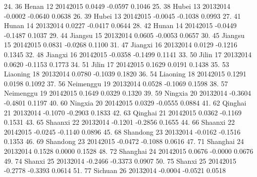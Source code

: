  24. {\VBAR}  36          Henan   12   2014{\tytilde}2015    0.0449   -0.0597   0.1046 {\VBAR}
 25. {\VBAR}  38          Hubei   13   2013{\tytilde}2014   -0.0002   -0.0640   0.0638 {\VBAR}
 26. {\VBAR}  39          Hubei   13   2014{\tytilde}2015   -0.0045   -0.1038   0.0993 {\VBAR}
 27. {\VBAR}  41          Hunan   14   2013{\tytilde}2014    0.0227   -0.0417   0.0644 {\VBAR}
 28. {\VBAR}  42          Hunan   14   2014{\tytilde}2015   -0.0449   -0.1487   0.1037 {\VBAR}
 29. {\VBAR}  44        Jiangsu   15   2013{\tytilde}2014    0.0605   -0.0053   0.0657 {\VBAR}
 30. {\VBAR}  45        Jiangsu   15   2014{\tytilde}2015    0.0831   -0.0268   0.1100 {\VBAR}
 31. {\VBAR}  47        Jiangxi   16   2013{\tytilde}2014    0.0129   -0.1216   0.1345 {\VBAR}
 32. {\VBAR}  48        Jiangxi   16   2014{\tytilde}2015   -0.0358   -0.1499   0.1141 {\VBAR}
 33. {\VBAR}  50          Jilin   17   2013{\tytilde}2014    0.0620   -0.1153   0.1773 {\VBAR}
 34. {\VBAR}  51          Jilin   17   2014{\tytilde}2015    0.1629    0.0191   0.1438 {\VBAR}
 35. {\VBAR}  53       Liaoning   18   2013{\tytilde}2014    0.0780   -0.1039   0.1820 {\VBAR}
 36. {\VBAR}  54       Liaoning   18   2014{\tytilde}2015    0.1291    0.0198   0.1092 {\VBAR}
 37. {\VBAR}  56      Neimenggu   19   2013{\tytilde}2014    0.0528   -0.1069   0.1598 {\VBAR}
 38. {\VBAR}  57      Neimenggu   19   2014{\tytilde}2015    0.1649    0.0329   0.1320 {\VBAR}
 39. {\VBAR}  59        Ningxia   20   2013{\tytilde}2014   -0.3604   -0.4801   0.1197 {\VBAR}
 40. {\VBAR}  60        Ningxia   20   2014{\tytilde}2015    0.0329   -0.0555   0.0884 {\VBAR}
 41. {\VBAR}  62        Qinghai   21   2013{\tytilde}2014   -0.1070   -0.2903   0.1833 {\VBAR}
 42. {\VBAR}  63        Qinghai   21   2014{\tytilde}2015    0.0362   -0.1169   0.1531 {\VBAR}
 43. {\VBAR}  65        Shaanxi   22   2013{\tytilde}2014   -0.1201   -0.2856   0.1655 {\VBAR}
 44. {\VBAR}  66        Shaanxi   22   2014{\tytilde}2015   -0.0245   -0.1140   0.0896 {\VBAR}
 45. {\VBAR}  68       Shandong   23   2013{\tytilde}2014   -0.0162   -0.1516   0.1353 {\VBAR}
 46. {\VBAR}  69       Shandong   23   2014{\tytilde}2015   -0.0472   -0.1088   0.0616 {\VBAR}
 47. {\VBAR}  71       Shanghai   24   2013{\tytilde}2014    0.1528    0.0000   0.1528 {\VBAR}
 48. {\VBAR}  72       Shanghai   24   2014{\tytilde}2015    0.0676   -0.0000   0.0676 {\VBAR}
 49. {\VBAR}  74         Shanxi   25   2013{\tytilde}2014   -0.2466   -0.3373   0.0907 {\VBAR}
 50. {\VBAR}  75         Shanxi   25   2014{\tytilde}2015   -0.2778   -0.3393   0.0614 {\VBAR}
 51. {\VBAR}  77        Sichuan   26   2013{\tytilde}2014   -0.0004   -0.0521   0.0518 {\VBAR}
